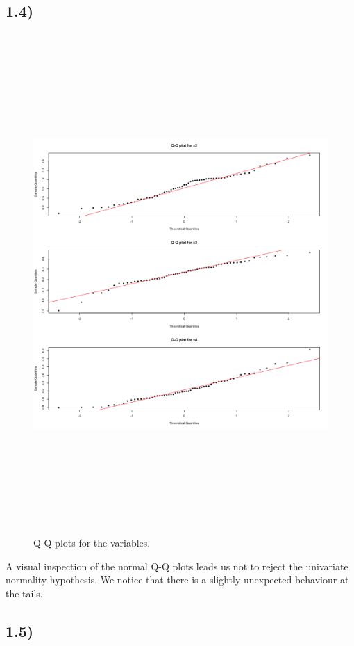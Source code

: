 \documentclass[a4paper,11pt,oneside]{report}
\begin{document}
\subsection*{1.4)}
	\begin{figure}[H]
	\includegraphics[width = 15cm, height = 19cm]{q_qplot_ex1.png}
	\caption{Q-Q plots for the variables.}
	\end{figure}
	A visual inspection of the normal Q-Q plots leads us not to reject the univariate normality hypothesis. We notice that there is a slightly unexpected behaviour at the tails.
	
\subsection*{1.5)}
	
\end{document}

